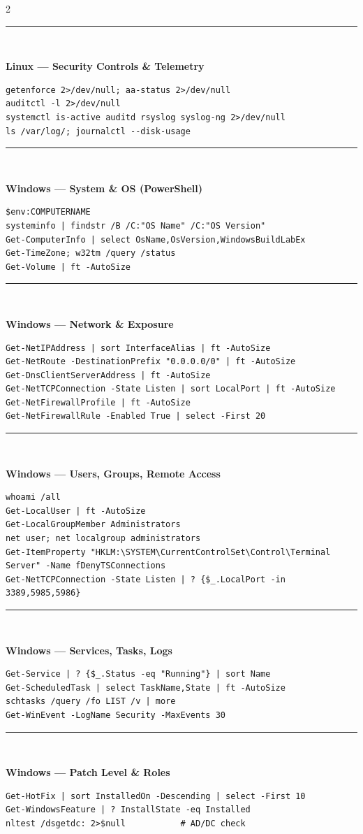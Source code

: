 \documentclass[9pt,landscape]{article}
\newcommand{\colorsec}[2]{%
  \vspace{0.8ex plus 0.3ex minus 0.3ex}%
  \noindent\rule{\linewidth}{0.4pt}\\[-0.8ex]%
  \noindent\colorbox{#1}{\parbox{\dimexpr\linewidth-2\fboxsep}{%
    \strut\textbf{\small\color{sblue} #2}}}%
  \vspace{0.3ex}\par\nobreak%
}
\begin{document}
\begin{multicols}{2}
\colorsec{secred}{Linux --- Security Controls \& Telemetry}
\begin{lstlisting}
getenforce 2>/dev/null; aa-status 2>/dev/null
auditctl -l 2>/dev/null
systemctl is-active auditd rsyslog syslog-ng 2>/dev/null
ls /var/log/; journalctl --disk-usage
\end{lstlisting}

\columnbreak

\colorsec{secteal}{Windows --- System \& OS (PowerShell)}
\begin{lstlisting}
$env:COMPUTERNAME
systeminfo | findstr /B /C:"OS Name" /C:"OS Version"
Get-ComputerInfo | select OsName,OsVersion,WindowsBuildLabEx
Get-TimeZone; w32tm /query /status
Get-Volume | ft -AutoSize
\end{lstlisting}

\colorsec{secteal}{Windows --- Network \& Exposure}
\begin{lstlisting}
Get-NetIPAddress | sort InterfaceAlias | ft -AutoSize
Get-NetRoute -DestinationPrefix "0.0.0.0/0" | ft -AutoSize
Get-DnsClientServerAddress | ft -AutoSize
Get-NetTCPConnection -State Listen | sort LocalPort | ft -AutoSize
Get-NetFirewallProfile | ft -AutoSize
Get-NetFirewallRule -Enabled True | select -First 20
\end{lstlisting}

\colorsec{secpurple}{Windows --- Users, Groups, Remote Access}
\begin{lstlisting}
whoami /all
Get-LocalUser | ft -AutoSize
Get-LocalGroupMember Administrators
net user; net localgroup administrators
Get-ItemProperty "HKLM:\SYSTEM\CurrentControlSet\Control\Terminal Server" -Name fDenyTSConnections
Get-NetTCPConnection -State Listen | ? {$_.LocalPort -in 3389,5985,5986}
\end{lstlisting}

\colorsec{secgreen}{Windows --- Services, Tasks, Logs}
\begin{lstlisting}
Get-Service | ? {$_.Status -eq "Running"} | sort Name
Get-ScheduledTask | select TaskName,State | ft -AutoSize
schtasks /query /fo LIST /v | more
Get-WinEvent -LogName Security -MaxEvents 30
\end{lstlisting}

\colorsec{secyellow}{Windows --- Patch Level \& Roles}
\begin{lstlisting}
Get-HotFix | sort InstalledOn -Descending | select -First 10
Get-WindowsFeature | ? InstallState -eq Installed
nltest /dsgetdc: 2>$null           # AD/DC check
\end{lstlisting}


\end{multicols}
\end{document}
